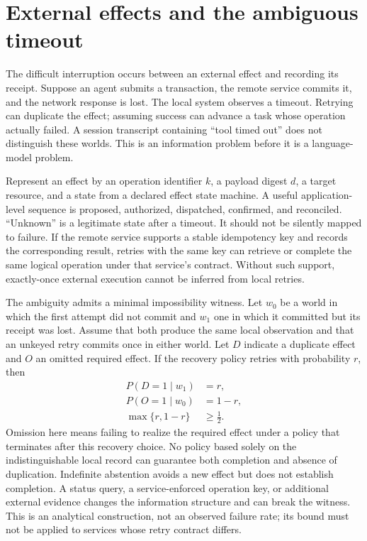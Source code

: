\section{External effects and the ambiguous timeout}\label{sec:C13:effects}
The difficult interruption occurs between an external effect and recording its receipt. Suppose an agent submits a transaction, the remote service commits it, and the network response is lost. The local system observes a timeout. Retrying can duplicate the effect; assuming success can advance a task whose operation actually failed. A session transcript containing ``tool timed out'' does not distinguish these worlds. This is an information problem before it is a language-model problem.

Represent an effect by an operation identifier $k$, a payload digest $d$, a target resource, and a state from a declared effect state machine. A useful application-level sequence is proposed, authorized, dispatched, confirmed, and reconciled. ``Unknown'' is a legitimate state after a timeout. It should not be silently mapped to failure. If the remote service supports a stable idempotency key and records the corresponding result, retries with the same key can retrieve or complete the same logical operation under that service's contract. Without such support, exactly-once external execution cannot be inferred from local retries.

The ambiguity admits a minimal impossibility witness. Let $w_0$ be a world in which the first attempt did not commit and $w_1$ one in which it committed but its receipt was lost. Assume that both produce the same local observation and that an unkeyed retry commits once in either world. Let $D$ indicate a duplicate effect and $O$ an omitted required effect. If the recovery policy retries with probability $r$, then
\begin{align}
 P(D=1\mid w_1)&=r,\\
 P(O=1\mid w_0)&=1-r,\\
 \max\{r,1-r\}&\geq\tfrac12.
\end{align}
Omission here means failing to realize the required effect under a policy that terminates after this recovery choice. No policy based solely on the indistinguishable local record can guarantee both completion and absence of duplication. Indefinite abstention avoids a new effect but does not establish completion. A status query, a service-enforced operation key, or additional external evidence changes the information structure and can break the witness. This is an analytical construction, not an observed failure rate; its bound must not be applied to services whose retry contract differs.

